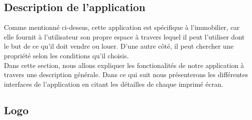 \documentclass[french,a4,12pt]{report}
\begin{document}
\newpage
\begin{tcolorbox}[leftrule=3mm]
	\section{Description de  l'application}
\end{tcolorbox}

Comme mentionné ci-dessus, cette application est spécifique à l'immobilier, car elle fournit à l'utilisateur son propre espace à travers lequel il peut l'utiliser dont le but de ce qu'il doit vendre ou louer. D'une autre côté, il peut chercher une propriété selon les conditions qu'il choisis.\\
\quad Dans cette section, nous allons expliquer les fonctionalités de notre application à travers une description générale. Dans ce qui suit nous présenterons les différentes interfaces de l’application en citant les détailles de chaque imprimé écran.
\subsection*{ Logo}
\end{document}
